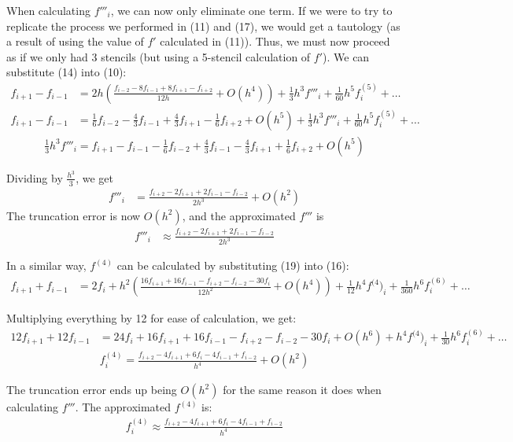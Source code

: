 \documentclass{article}
\begin{document}
When calculating $f'''_i$, we can now only eliminate one term. If we
were to try to replicate the process we performed in (11) and (17), we
would get a tautology (as a result of using the value of $f'$ calculated
in (11)). Thus, we must now proceed as if we only had 3 stencils (but
using a 5-stencil calculation of $f'$).  We can substitute (14) into
(10):
\begin{align}
  f_{i+1} - f_{i-1} &= 2h(\frac{f_{i-2} - 8f_{i-1} + 8f_{i+1} - f_{i+2}}{12h} + O(h^4)) + \frac{1}{3}h^3 f'''_i + \frac{1}{60}h^5 f^{(5)}_i + \dots
\end{align}
\begin{align}
  f_{i+1} - f_{i-1} &= \frac{1}{6}f_{i-2} - \frac{4}{3}f_{i-1} + \frac{4}{3}f_{i+1} - \frac{1}{6}f_{i+2} + O(h^5) + \frac{1}{3}h^3 f'''_i + \frac{1}{60}h^5 f^{(5)}_i + \dots
\end{align}
\begin{align}
  \frac{1}{3}h^3 f'''_i = f_{i+1} - f_{i-1} - \frac{1}{6}f_{i-2} + \frac{4}{3}f_{i-1} - \frac{4}{3}f_{i+1} + \frac{1}{6}f_{i+2} + O(h^5)
\end{align}

Dividing by $\frac{h^3}{3}$, we get
\begin{align}
  f'''_i &= \frac{f_{i+2} - 2f_{i+1} + 2f_{i-1} - f_{i-2}}{2h^3} + O(h^2)
\end{align}
The truncation error is now $O(h^2)$, and the approximated $f'''$ is
\begin{align}
  f'''_i &\approx \frac{f_{i+2} - 2f_{i+1} + 2f_{i-1} - f_{i-2}}{2h^3}
\end{align}

In a similar way, $f^{(4)}$ can be calculated by substituting (19) into (16):
\begin{align}
  f_{i+1} + f_{i-1} &= 2f_i + h^2(\frac{16f_{i+1} + 16f_{i-1} - f_{i+2} - f_{i-2} - 30f_i}{12h^2} + O(h^4)) + \frac{1}{12}h^4 f^{(4})_i + \frac{1}{360}h^6 f^{(6)}_i + \dots
\end{align}

Multiplying everything by 12 for ease of calculation, we get:
\begin{align}
  12f_{i+1} + 12f_{i-1} &= 24f_i + 16f_{i+1} + 16f_{i-1} - f_{i+2} - f_{i-2} - 30f_i + O(h^6) + h^4 f^{(4})_i + \frac{1}{30}h^6 f^{(6)}_i + \dots
\end{align}
\begin{align}
  f^{(4)}_i = \frac{f_{i+2} - 4f_{i+1} + 6f_i - 4f_{i-1} + f_{i-2}}{h^4} + O(h^2)
\end{align}

The truncation error ends up being $O(h^2)$ for the same reason it does when calculating $f'''$. The approximated $f^{(4)}$ is:
\begin{align}
  f^{(4)}_i \approx \frac{f_{i+2} - 4f_{i+1} + 6f_i - 4f_{i-1} + f_{i-2}}{h^4}
\end{align}
\end{document}
